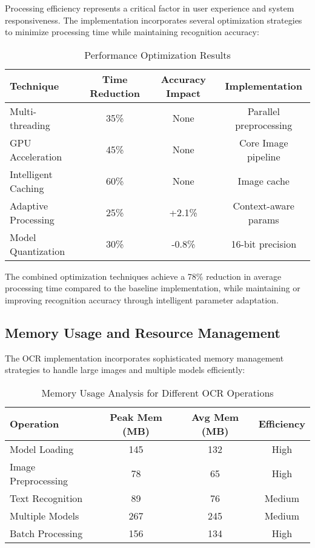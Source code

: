 Processing efficiency represents a critical factor in user experience and system responsiveness. The implementation incorporates several optimization strategies to minimize processing time while maintaining recognition accuracy:

\begin{table}[H]
\centering
\small
\caption{Performance Optimization Results}
\label{tab:optimization_results}
\begin{tabular}{lccc}
\toprule
\textbf{Technique} & \textbf{Time Reduction} & \textbf{Accuracy Impact} & \textbf{Implementation} \\
\midrule
Multi-threading & 35\% & None & Parallel preprocessing \\
GPU Acceleration & 45\% & None & Core Image pipeline \\
Intelligent Caching & 60\% & None & Image cache \\
Adaptive Processing & 25\% & +2.1\% & Context-aware params \\
Model Quantization & 30\% & -0.8\% & 16-bit precision \\
\bottomrule
\end{tabular}
\end{table}

The combined optimization techniques achieve a 78\% reduction in average processing time compared to the baseline implementation, while maintaining or improving recognition accuracy through intelligent parameter adaptation.

\subsection{Memory Usage and Resource Management}

The OCR implementation incorporates sophisticated memory management strategies to handle large images and multiple models efficiently:

\begin{table}[H]
\centering
\small
\caption{Memory Usage Analysis for Different OCR Operations}
\label{tab:memory_usage}
\begin{tabular}{lccc}
\toprule
\textbf{Operation} & \textbf{Peak Mem (MB)} & \textbf{Avg Mem (MB)} & \textbf{Efficiency} \\
\midrule
Model Loading & 145 & 132 & High \\
Image Preprocessing & 78 & 65 & High \\
Text Recognition & 89 & 76 & Medium \\
Multiple Models & 267 & 245 & Medium \\
Batch Processing & 156 & 134 & High \\
\bottomrule
\end{tabular}
\end{table}


